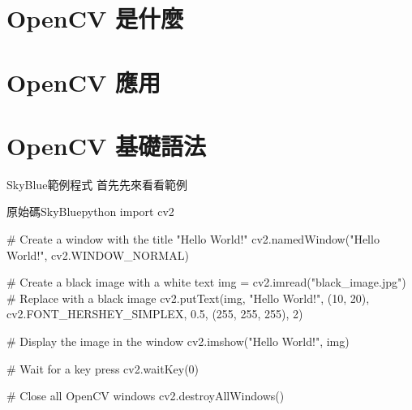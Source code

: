 \documentclass{article}
\begin{document}

\begin{large}


\section{OpenCV 是什麼}
\section{OpenCV 應用}
\section{OpenCV 基礎語法}
\begin{boxpar}{SkyBlue}{範例程式}
首先先來看看範例
    \begin{mintbox}{原始碼}{SkyBlue}{python} %
import cv2

# Create a window with the title "Hello World!"
cv2.namedWindow("Hello World!", cv2.WINDOW_NORMAL)

# Create a black image with a white text
img = cv2.imread("black_image.jpg")  # Replace with a black image
cv2.putText(img, "Hello World!", (10, 20), cv2.FONT_HERSHEY_SIMPLEX, 0.5, (255, 255, 255), 2)

# Display the image in the window
cv2.imshow("Hello World!", img)

# Wait for a key press
cv2.waitKey(0)

# Close all OpenCV windows
cv2.destroyAllWindows()
    \end{mintbox}
\end{boxpar}


\end{large}
\end{document}

